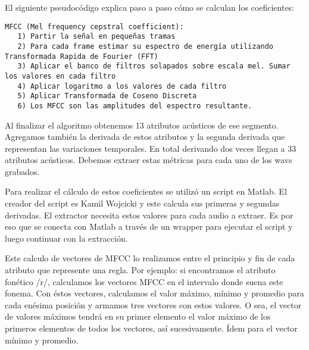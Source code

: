 El siguiente pseudocódigo explica paso a paso cómo se calculan los coeficientes:
\begin{lstlisting}[numbers=none, keywordstyle=\ttfamily]
   MFCC (Mel frequency cepstral coefficient):
   1) Partir la señal en pequeñas tramas 
   2) Para cada frame estimar su espectro de energía utilizando Transformada Rapida de Fourier (FFT)
   3) Aplicar el banco de filtros solapados sobre escala mel. Sumar los valores en cada filtro
   4) Aplicar logaritmo a los valores de cada filtro
   5) Aplicar Transformada de Coseno Discreta
   6) Los MFCC son las amplitudes del espectro resultante.
\end{lstlisting}

Al finalizar el algoritmo obtenemos 13 atributos acústicos de ese segmento. Agregamos también la derivada de estos atributos y la segunda derivada que representan las variaciones temporales. En total derivando dos veces llegan a 33 atributos acústicos. Debemos extraer estas métricas para cada uno de los wavs grabados.

Para realizar el cálculo de estos coeficientes se utilizó un script en Matlab. El creador del script es Kamil Wojcicki y este calcula  sus primeras y segundas derivadas. El extractor necesita estos valores para cada audio a extraer. Es por eso que se conecta con Matlab a través de un wrapper para ejecutar el script y luego continuar con la extracción.

Este calculo de vectores de MFCC lo realizamos entre el principio y fin de cada atributo que represente una regla. Por ejemplo: si encontramos el atributo fonético /r/, calculamos los vectores MFCC en el intervalo donde suena este fonema. Con éstos vectores, calculamos el valor máximo, mínimo y promedio para cada enésima posición y armamos tres vectores con estos valores. O sea, el vector de valores máximos tendrá en su primer elemento el valor máximo de los primeros elementos de todos los vectores, así sucesivamente. Ídem para el vector mínimo y promedio. 


